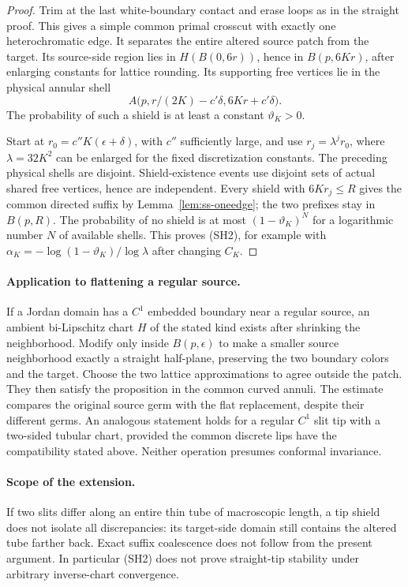 \documentclass[11pt]{article}
\theoremstyle{definition}\newtheorem{definition}[theorem]{Definition}
\theoremstyle{remark}\newtheorem{remark}[theorem]{Remark}
\begin{document}
\begin{proof}
Trim at the last white-boundary contact and erase loops as in the straight
proof. This gives a simple common primal crosscut with exactly one
heterochromatic edge. It separates the entire altered source patch from
the target. Its source-side region lies in $H(B(0,6r))$, hence in
$B(p,6Kr)$, after enlarging constants for lattice rounding. Its supporting
free vertices lie in the physical annular shell
\[
 A\bigl(p,r/(2K)-c'\delta,6Kr+c'\delta\bigr).
\]
The probability of such a shield is at least a constant $\vartheta_K>0$.

Start at $r_0=c''K(\epsilon+\delta)$, with $c''$ sufficiently large, and
use $r_j=\lambda^jr_0$, where $\lambda=32K^2$ can be enlarged for the
fixed discretization constants. The preceding physical shells are
disjoint. Shield-existence events use disjoint sets of actual shared free
vertices, hence are independent. Every shield with $6Kr_j\le R$ gives
the common directed suffix by Lemma~\ref{lem:ss-oneedge}; the two prefixes
stay in $B(p,R)$. The probability of no shield is at most
$(1-\vartheta_K)^N$ for a logarithmic number $N$ of available shells.
This proves (SH2), for example with
$\alpha_K=-\log(1-\vartheta_K)/\log\lambda$ after changing $C_K$.
\end{proof}

\paragraph{Application to flattening a regular source.}
If a Jordan domain has a $C^1$ embedded boundary near a regular source,
an ambient bi-Lipschitz chart $H$ of the stated kind exists after shrinking
the neighborhood. Modify only inside $B(p,\epsilon)$ to make a smaller
source neighborhood exactly a straight half-plane, preserving the two
boundary colors and the target. Choose the two lattice approximations
to agree outside the patch. They then satisfy the proposition in the
common curved annuli. The estimate compares the original source germ
with the flat replacement, despite their different germs. An analogous
statement holds for a regular $C^1$ slit tip with a two-sided tubular
chart, provided the common discrete lips have the compatibility stated
above. Neither operation presumes conformal invariance.

\paragraph{Scope of the extension.}
If two slits differ along an entire thin tube of macroscopic length, a
tip shield does not isolate all discrepancies: its target-side domain
still contains the altered tube farther back. Exact suffix coalescence
does not follow from the present argument. In particular (SH2) does not
prove straight-tip stability under arbitrary inverse-chart convergence.
\end{document}

